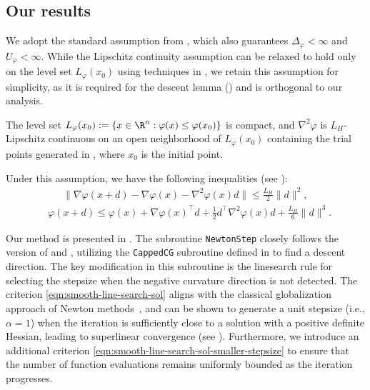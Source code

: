 \subsection{Our results} \label{sec:main/newton-cg-our-results}
We adopt the standard assumption from \citet{royer2020newton}, 
which also guarantees $\Delta_\varphi < \infty$ and $U_\varphi < \infty$.
While the Lipschitz continuity assumption can be relaxed to hold only on the level set $L_\varphi(x_0)$ using techniques in \citet{he2023newton},
we retain this assumption for simplicity, as it is required for the descent lemma () and is orthogonal to our analysis.
\begin{assumption}[Smoothness]
    \label{assumption:liphess}
    The level set $L_\varphi(x_0) := \{ x \in \R^n : \varphi(x) \leq \varphi(x_0) \}$ is compact, and $\nabla^2 \varphi$ is $L_H$-Lipschitz continuous on an open neighborhood of $L_\varphi(x_0)$ containing the trial points generated in ,
    where $x_0$ is the initial point.
\end{assumption}

Under this assumption, we have the following inequalities (see \citet{nesterov2018lectures}):
\begin{align}
    & \quad\,\,\, \| \nabla \varphi(x + d) - \nabla \varphi(x) - \nabla^2 \varphi(x)d \| \leq \frac{L_H}{2} \|d\|^2
    ,  
    \label{eqn:hessian-lip-gradient-inequ}
    \\
   & \varphi(x + d) \leq 
    \varphi(x)
    + \nabla \varphi(x)^\top d
    + \frac{1}{2}d^\top\nabla^2 \varphi(x) d
    + \frac{L_H}{6} \| d \|^3.
    \label{eqn:hessian-lip-value-inequ}
\end{align}

Our method is presented in . 
The subroutine \texttt{NewtonStep} closely follows the version of \citet{royer2020newton} and \citet{he2023newton},
utilizing the \texttt{CappedCG} subroutine defined in  to find a descent direction.
The key modification in this subroutine is the linesearch rule for selecting the stepsize when the negative curvature direction is not detected.
The criterion \eqref{eqn:smooth-line-search-sol} aligns with the classical globalization approach of Newton methods~\citep{facchinei1995minimization}, 
and can be shown to generate a unit stepsize (i.e., $\alpha = 1$) when the iteration is sufficiently close to a solution with a positive definite Hessian, 
leading to superlinear convergence (see ).
Furthermore, we introduce an additional criterion \eqref{eqn:smooth-line-search-sol-smaller-stepsize} to 
ensure that the number of function evaluations remains uniformly bounded as the iteration progresses.

